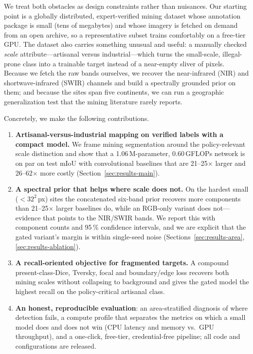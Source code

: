 \documentclass[review]{elsarticle}
\begin{document}
We treat both obstacles as design constraints rather than nuisances. Our starting point is a
globally distributed, expert-verified mining dataset whose annotation package is small (tens
of megabytes) and whose imagery is fetched on demand from an open archive, so a
representative subset trains comfortably on a free-tier GPU. The dataset also carries
something unusual and useful: a manually checked \emph{scale} attribute---artisanal versus
industrial---which turns the small-scale, illegal-prone class into a trainable target
instead of a near-empty sliver of pixels. Because we fetch the raw bands ourselves, we
recover the near-infrared (NIR) and shortwave-infrared (SWIR) channels and build a
spectrally grounded prior on them; and because the sites span five continents, we can run a
geographic generalization test that the mining literature rarely reports.

Concretely, we make the following contributions.
\begin{enumerate}
\item \textbf{Artisanal-versus-industrial mapping on verified labels with a compact model.}
We frame mining segmentation around the policy-relevant scale distinction and show that a
\num{1.06}\,M-parameter, \num{0.60}\,GFLOPs network is on par on test mIoU with
convolutional baselines that are \num{21}--\num{25}$\times$ larger and \num{26}--\num{62}$\times$
more costly (Section~\ref{sec:results-main}).
\item \textbf{A spectral prior that helps where scale does not.} On the hardest small
($<32^2$\,px) sites the concatenated six-band prior recovers more components than
\num{21}--\num{25}$\times$ larger baselines do, while an RGB-only variant does not---evidence
that points to the NIR/SWIR bands. We report this with component counts and \num{95}\,\%
confidence intervals, and we are explicit that the gated variant's margin is within
single-seed noise (Sections~\ref{sec:results-area}, \ref{sec:results-ablation}).
\item \textbf{A recall-oriented objective for fragmented targets.} A compound
present-class-Dice, Tversky, focal and boundary/edge loss recovers both mining scales
without collapsing to background and gives the gated model the highest recall on the
policy-critical artisanal class.
\item \textbf{An honest, reproducible evaluation}: an area-stratified diagnosis of where
detection fails, a compute profile that separates the metrics on which a small model does
and does not win (CPU latency and memory vs.\ GPU throughput), and a one-click, free-tier,
credential-free pipeline; all code and configurations are released.
\end{enumerate}
\end{document}
